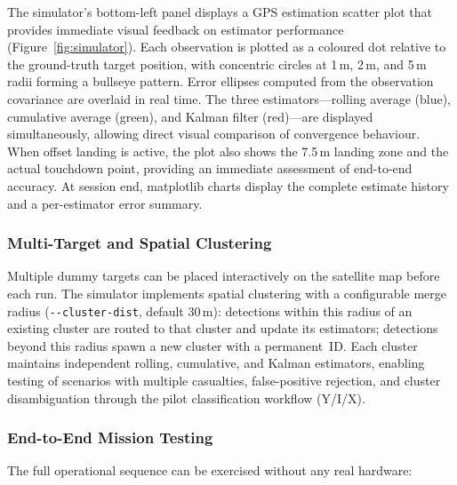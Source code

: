 The simulator's bottom-left panel displays a GPS estimation scatter plot that provides immediate visual feedback on estimator performance (Figure~\ref{fig:simulator}). Each observation is plotted as a coloured dot relative to the ground-truth target position, with concentric circles at 1\,m, 2\,m, and 5\,m radii forming a bullseye pattern. Error ellipses computed from the observation covariance are overlaid in real time. The three estimators---rolling average (blue), cumulative average (green), and Kalman filter (red)---are displayed simultaneously, allowing direct visual comparison of convergence behaviour. When offset landing is active, the plot also shows the 7.5\,m landing zone and the actual touchdown point, providing an immediate assessment of end-to-end accuracy. At session end, matplotlib charts display the complete estimate history and a per-estimator error summary.

\subsubsection{Multi-Target and Spatial Clustering}

Multiple dummy targets can be placed interactively on the satellite map before each run. The simulator implements spatial clustering with a configurable merge radius (\texttt{-{}-cluster-dist}, default 30\,m): detections within this radius of an existing cluster are routed to that cluster and update its estimators; detections beyond this radius spawn a new cluster with a permanent~ID. Each cluster maintains independent rolling, cumulative, and Kalman estimators, enabling testing of scenarios with multiple casualties, false-positive rejection, and cluster disambiguation through the pilot classification workflow (Y/I/X).

\subsubsection{End-to-End Mission Testing}

The full operational sequence can be exercised without any real hardware:

